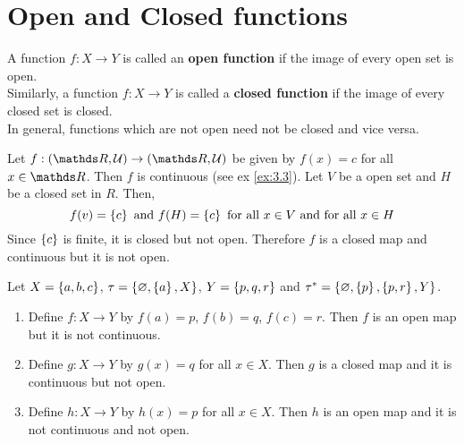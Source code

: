 \documentclass[../main-sheet.tex]{subfiles}
\begin{document}
\section{Open and Closed functions}
A function \(f:X\to Y\) is called an \textbf{open function} if the image of every open set is open.\\
Similarly, a function \(f:X\to Y\) is called a \textbf{closed function} if the image of every closed set is closed.\\
In general, functions which are not open need not be closed and vice versa.
\begin{ex}
    Let \(f:(\R,\mathcal{U})\to (\R,\mathcal{U})\) be given by \(f(x)=c\) for all \(x \in \R\). Then \(f\) is continuous (see ex \ref{ex:3.3}). Let \(V\) be a open set and \(H \) be a closed set in \(R\). Then,
    \[f(v)=\left\{c\right\}\text{ and }f(H)=\left\{c\right\}\text{ for all }x\in V \text{ and for all } x\in H\]
    Since \(\left\{c\right\} \) is finite, it is closed but not open. Therefore \(f\) is a closed map and continuous but it is not open.
\end{ex}
\begin{ex}
    Let \(X=\left\{a,b,c\right\}\), \(\tau=\left\{\varnothing,\left\{a\right\},X\right\}\), \(Y=\left\{p,q,r\right\}\) and \(\tau^{*}=\left\{\varnothing,\left\{p\right\},\left\{p,r\right\},Y\right\}\).
    \begin{enumerate}
        \item Define \(f:X\to Y\) by \(f(a)=p\), \(f(b)=q\), \(f(c)=r\). Then \(f\) is an open map but it is not continuous.
        \item Define \(g:X\to Y\) by \(g(x)=q\) for all \(x\in X\). Then \(g\) is a closed map and it is continuous but not open.
        \item Define \(h:X\to Y\) by \(h(x)=p\) for all \(x\in X\). Then \(h\) is an open map and it is not continuous and not open.
    \end{enumerate}
\end{ex}
\end{document}
